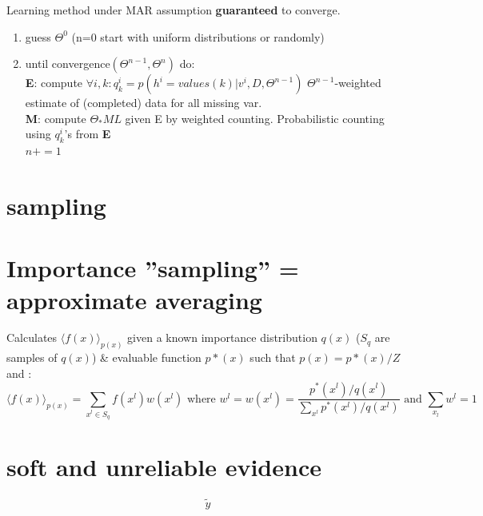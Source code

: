 \documentclass[a4paper,10pt]{article}
\newcommand{\ty}{\tilde{y}}
\begin{document}
Learning method under MAR assumption \textbf{guaranteed} to converge.

\begin{enumerate}
 \item guess $\Theta^0$ (n=0 start with uniform distributions or randomly)
 \item until convergence$(\Theta^{n-1},\Theta^{n})$ do: \\
       \textbf{E}: compute $\forall i,k : q^i_{k} = p(h^i=values(k) | v^i, D, \Theta^{n-1})$ \hfill $\Theta^{n-1}$-weighted estimate of (completed) data for all missing var. \\
       \textbf{M}: compute $\Theta_*ML$ given E by weighted counting. \hfill Probabilistic counting using $q^i_k$'s from \textbf{E}\\
       $n += 1$
\end{enumerate}


\section{sampling}


\section{Importance ''sampling'' = approximate averaging}

Calculates $\langle f(x) \rangle_{p(x)}$ given a known importance distribution $q(x)$ ($S_q$ are samples of $q(x)$) \& evaluable function $p*(x)$ such that $p(x) = p*(x)/Z$ and    : 
$$ \langle f(x) \rangle_{p(x)} = \sum_{x^l \in S_q} f(x^l) w(x^l) \textrm{ where } w^l = w(x^l) = \frac{p^*(x^l)/q(x^l)}{\sum_{x^l} p^*(x^l)/q(x^l)} \textrm{ and } \sum_{x_l} w^l = 1$$

\section{soft and unreliable evidence}

$$ \ty $$
\end{document}
